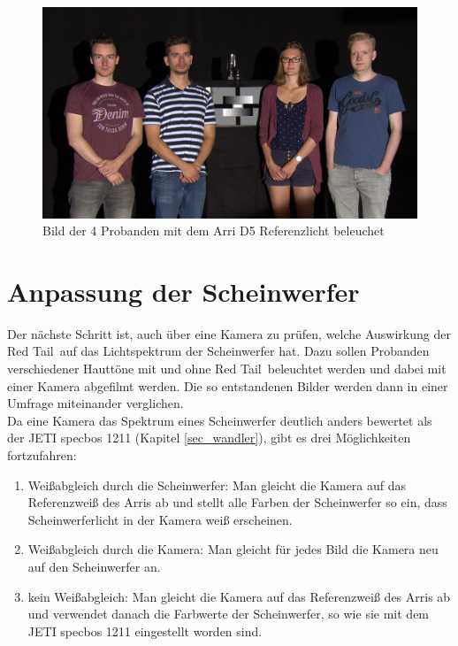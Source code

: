 \begin{figure}[H]     %
\centering
\includegraphics[width=1.0\textwidth]{bilder/umfrage1} 
\caption {Bild der 4 Probanden mit dem Arri D5 Referenzlicht beleuchet}\label{b_umfrage1}
\end{figure}


\section{Anpassung der Scheinwerfer}

Der nächste Schritt ist, auch über eine Kamera zu prüfen, welche Auswirkung der \glqq Red Tail\grqq\ auf das Lichtspektrum der Scheinwerfer hat. Dazu sollen Probanden verschiedener Hauttöne mit und ohne \glqq Red Tail\grqq\ beleuchtet werden und dabei mit einer Kamera abgefilmt werden. Die so entstandenen Bilder werden dann in einer Umfrage miteinander verglichen.\\
Da eine Kamera das Spektrum eines Scheinwerfer deutlich anders bewertet als der JETI specbos 1211 (Kapitel \ref{sec_wandler}), gibt es drei Möglichkeiten fortzufahren:

\begin{enumerate}\setlength{\itemsep}{0ex}
\item Weißabgleich durch die Scheinwerfer: Man gleicht die Kamera auf das Referenzweiß des Arris ab und stellt alle Farben der Scheinwerfer so ein, dass Scheinwerferlicht in der Kamera weiß erscheinen.
\item Weißabgleich durch die Kamera: Man gleicht für jedes Bild die Kamera neu auf den Scheinwerfer an.
\item kein Weißabgleich: Man gleicht die Kamera auf das Referenzweiß des Arris ab und verwendet danach die Farbwerte der Scheinwerfer, so wie sie mit dem JETI specbos 1211 eingestellt worden sind.
\end{enumerate}

